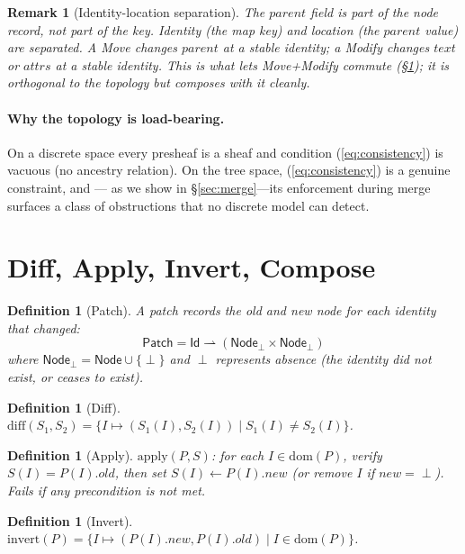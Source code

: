 \documentclass[11pt,a4paper]{article}
\newtheorem{definition}[theorem]{Definition}
\newtheorem{remark}[theorem]{Remark}
\newcommand{\Id}{\mathsf{Id}}
\newcommand{\Node}{\mathsf{Node}}
\newcommand{\Patch}{\mathsf{Patch}}
\begin{document}
\begin{remark}[Identity-location separation]
The $parent$ field is part of the node \emph{record}, not part of the key.
Identity (the map key) and location (the $parent$ value) are separated.
A Move changes $parent$ at a stable identity; a Modify changes $text$ or
$attrs$ at a stable identity. This is what lets Move+Modify commute
(\S\ref{sec:algebra}); it is orthogonal to the topology but composes with
it cleanly.
\end{remark}

\paragraph{Why the topology is load-bearing.}
On a discrete space every presheaf is a sheaf and condition (\ref{eq:consistency})
is vacuous (no ancestry relation). On the tree space, (\ref{eq:consistency})
is a genuine constraint, and --- as we show in \S\ref{sec:merge}---its
enforcement during merge surfaces a class of obstructions that no discrete
model can detect.


\section{Diff, Apply, Invert, Compose}
\label{sec:algebra}

\begin{definition}[Patch]
A \emph{patch} records the old and new node for each identity that changed:
\[
\Patch = \Id \rightharpoonup (\Node_{\perp} \times \Node_{\perp})
\]
where $\Node_{\perp} = \Node \cup \{\perp\}$ and $\perp$ represents absence
(the identity did not exist, or ceases to exist).
\end{definition}

\begin{definition}[Diff]
$\mathrm{diff}(S_1, S_2) = \{ I \mapsto (S_1(I), S_2(I)) \mid S_1(I) \neq
S_2(I) \}$.
\end{definition}

\begin{definition}[Apply]
$\mathrm{apply}(P, S)$: for each $I \in \mathrm{dom}(P)$, verify $S(I) = P(I).old$,
then set $S(I) \leftarrow P(I).new$ (or remove $I$ if $new = \perp$).
Fails if any precondition is not met.
\end{definition}

\begin{definition}[Invert]
$\mathrm{invert}(P) = \{ I \mapsto (P(I).new, P(I).old) \mid I \in \mathrm{dom}(P) \}$.
\end{definition}
\end{document}
